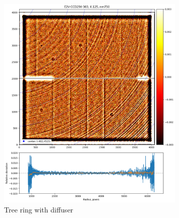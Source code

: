 \begin{figure}
\centering
\includegraphics[width=0.8\textwidth]{figures/TR_w_diffuser.png}
\caption{Tree ring with diffuser}
\end{figure}

\clearpage
